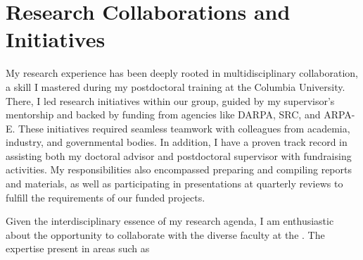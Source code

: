 


\section{Research Collaborations and Initiatives}

My research experience has been deeply rooted in multidisciplinary collaboration, a skill I mastered during my postdoctoral training at the Columbia University. There, I led research initiatives within our group, guided by my supervisor's mentorship and backed by funding from agencies like DARPA, SRC, and ARPA-E. These initiatives required seamless teamwork with colleagues from academia, industry, and governmental bodies. In addition, I have a proven track record in assisting both my doctoral advisor and postdoctoral supervisor with fundraising activities. My responsibilities also encompassed preparing and compiling reports and materials, as well as participating in presentations at quarterly reviews to fulfill the requirements of our funded projects.

Given the interdisciplinary essence of my research agenda, I am enthusiastic about the opportunity to collaborate with the diverse faculty at the \appSchool{}. The expertise present in areas such as%